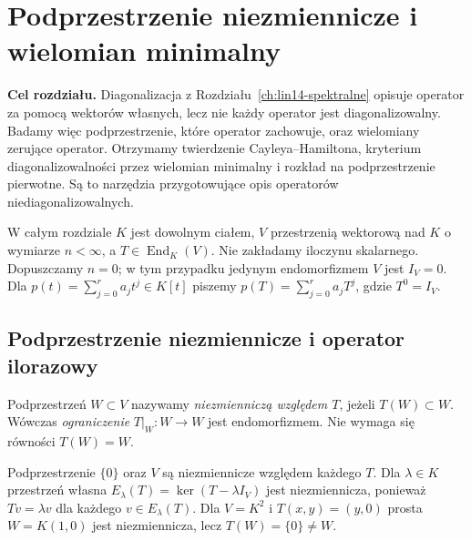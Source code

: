 \chapter{Podprzestrzenie niezmiennicze i wielomian minimalny}
\label{ch:lin16-niezmiennicze}

\noindent\textbf{Cel rozdziału.}
Diagonalizacja z Rozdziału~\ref{ch:lin14-spektralne}
opisuje operator za pomocą wektorów własnych,
lecz nie każdy operator jest diagonalizowalny.
Badamy więc podprzestrzenie, które operator
zachowuje, oraz wielomiany zerujące operator.
Otrzymamy twierdzenie Cayleya--Hamiltona,
kryterium diagonalizowalności przez wielomian minimalny
i rozkład na podprzestrzenie pierwotne.
Są to narzędzia przygotowujące opis
operatorów niediagonalizowalnych.

W całym rozdziale \(K\) jest dowolnym ciałem,
\(V\) przestrzenią wektorową nad \(K\)
o wymiarze \(n<\infty\),
a \(T\in\operatorname{End}_K(V)\).
Nie zakładamy iloczynu skalarnego.
Dopuszczamy \(n=0\); w tym przypadku
jedynym endomorfizmem \(V\) jest \(I_V=0\).
Dla \(p(t)=\sum_{j=0}^r a_jt^j\in K[t]\)
piszemy \(p(T)=\sum_{j=0}^r a_jT^j\),
gdzie \(T^0=I_V\).

\section{Podprzestrzenie niezmiennicze i operator ilorazowy}
\label{sec:lin16-invariant}

\begin{definicja}
\label{def:lin16-invariant}
Podprzestrzeń \(W\subset V\)
nazywamy \emph{niezmienniczą względem \(T\)},
jeżeli \(T(W)\subset W\).
Wówczas \emph{ograniczenie}
\(T|_W\colon W\to W\) jest endomorfizmem.
Nie wymaga się równości \(T(W)=W\).
\end{definicja}

\begin{przyklad}
\label{prz:lin16-basic-invariant}
Podprzestrzenie \(\{0\}\) oraz \(V\)
są niezmiennicze względem każdego \(T\).
Dla \(\lambda\in K\) przestrzeń własna
\(E_\lambda(T)=\ker(T-\lambda I_V)\)
jest niezmiennicza, ponieważ
\(Tv=\lambda v\) dla każdego
\(v\in E_\lambda(T)\).
Dla \(V=K^2\) i
\(T(x,y)=(y,0)\)
prosta \(W=K(1,0)\) jest niezmiennicza,
lecz \(T(W)=\{0\}\ne W\).
\end{przyklad}

